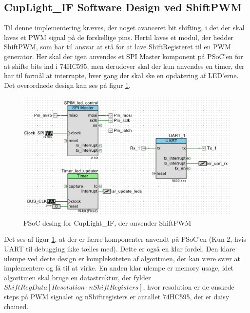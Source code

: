 \documentclass[Softwaredesign/Softwaredesign_main.tex]{subfiles}
\begin{document}
\subsection{CupLight\_IF Software Design ved ShiftPWM}
Til denne implementering kræves, der noget avanceret bit shifting, i det der skal laves et PWM signal på de forskellige pins. Hertil laves et modul, der hedder ShiftPWM, som har til ansvar at stå for at lave ShiftRegisteret til en PWM generator. Her skal der igen anvendes et SPI Master komponent på PSoC'en for at shifte bits ind i 74HC595, men derudover skal der kun anvendes en timer, der har til formål at interrupte, hver gang der skal ske en opdatering af LED'erne. Det overordnede design kan ses på figur \ref{fig:CupLight_ShiftPWM_PSoC_Design}.

\begin{figure}
    \centering
    \includegraphics{Softwaredesign/CupLight_IF/graphics/CupLightPSoCDesign_ShiftPWM.png}
    \caption{PSoC desing for CupLight\_IF, der anvender ShiftPWM}
    \label{fig:CupLight_ShiftPWM_PSoC_Design}
\end{figure}

Det ses af figur \ref{fig:CupLight_ShiftPWM_PSoC_Design}, at der er færre komponenter anvendt på PSoC'en (Kun 2, hvis UART til debugging ikke tælles med). Dette er også en klar fordel. Den klare ulempe ved dette design er kompleksiteten af algoritmen, der kan være svær at implementere og få til at virke. En anden klar ulempe er memory usage, idet algoritmen skal bruge en datastruktur, der fylder $ShiftRegData[Resolution \cdot nShiftRegisters]$, hvor resolution er de ønskede steps på PWM signalet og nShiftregisters er antallet 74HC595, der er daisy chained.
\end{document}
